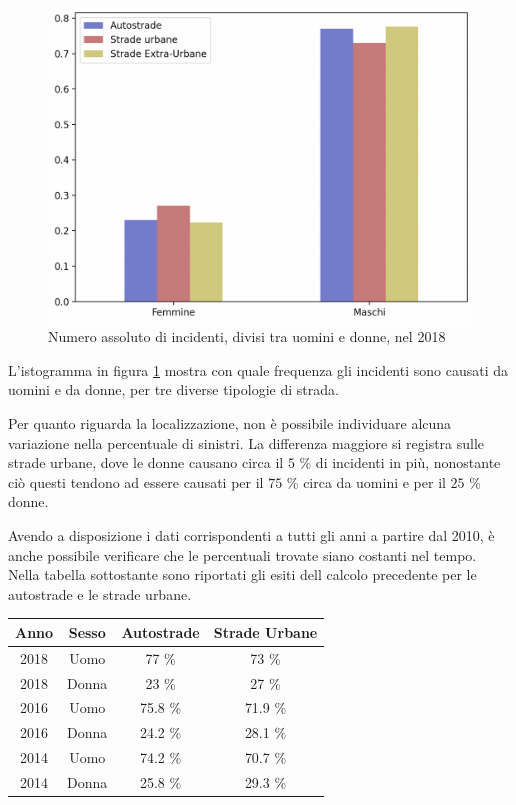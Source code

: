 \documentclass[a4paper]{report}
\begin{document}
\begin{figure}
    \hfill\includegraphics[width=0.7\linewidth]{../src/incidenti/incidenti_senza_coords/tipo_veicoli/uomo-donna.png}\hspace*{\fill}
    \caption{Numero assoluto di incidenti, divisi tra uomini e donne, nel 2018}
    \label{fig:differenza-uomo-donna}
\end{figure}

L'istogramma in figura \ref{fig:differenza-uomo-donna} mostra con quale frequenza 
gli incidenti sono causati da uomini e da donne, per tre diverse tipologie di strada. 

Per quanto riguarda la localizzazione, non è possibile individuare alcuna 
variazione nella percentuale di sinistri. 
La differenza maggiore si registra sulle strade urbane, dove le donne causano circa il 
$5$ \% di incidenti in più, nonostante ciò 
questi tendono ad essere causati per il $75$ \% circa da uomini e 
per il $25$ \% donne. 

Avendo a disposizione i dati corrispondenti a tutti gli anni a partire dal 2010, 
è anche possibile verificare che le percentuali trovate siano costanti  
nel tempo. 
Nella tabella sottostante sono riportati gli esiti dell calcolo precedente per le 
autostrade e le strade urbane. 

\begin{center}
    \def\arraystretch{1.5}%
    \begin{tabular}{ |c|c|c|c| }
        \hline
        Anno & Sesso & Autostrade & Strade Urbane \\ 
        \hline
        \rowcolor{TableGray}
        2018 & Uomo & 77 \%  & 73 \% \\
        2018 & Donna & 23 \% & 27 \% \\
        \rowcolor{TableGray}
        2016 & Uomo & 75.8 \%  & 71.9 \% \\
        2016 & Donna & 24.2 \% & 28.1 \% \\
        \rowcolor{TableGray}
        2014 & Uomo & 74.2 \%  & 70.7 \% \\
        2014 & Donna & 25.8 \% & 29.3 \% \\
        \hline
    \end{tabular}
\end{center}
\end{document}
